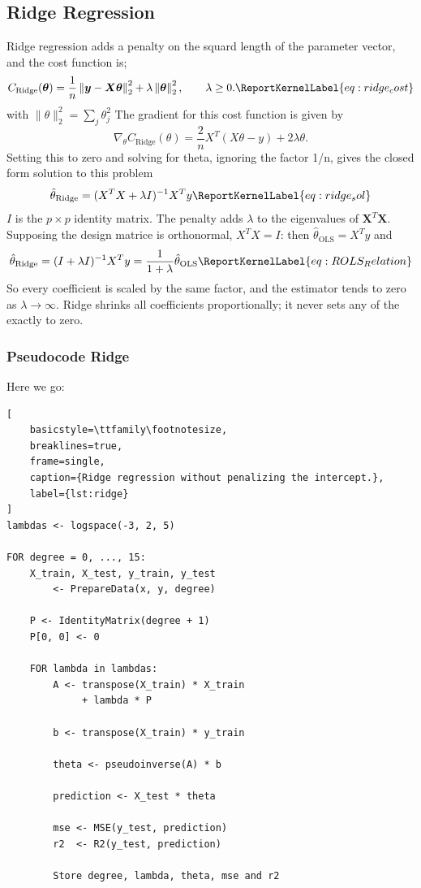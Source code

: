 \documentclass[aps,rmp,reprint,raggedbottom,amsmath,amssymb,longbibliography]{revtex4-1}
\let\label\ReportKernelLabel
\begin{document}
\subsection{Ridge Regression}
Ridge regression adds a penalty on the squard length of the parameter vector,
and the cost function is;
\begin{equation}
C_{\mathrm{Ridge}}(\bm{\theta})
= \frac{1}{n}
  \left\|\bm{y}-\bm{X}\bm{\theta}\right\|_2^2
  + \lambda\left\|\bm{\theta}\right\|_2^2,
\qquad \lambda \geq 0.
\label{eq:ridge_cost}
\end{equation}
with $\lVert\theta\rVert_2^2 = \sum_{j}\theta_j^2$ \newline 
The gradient for this cost function is given by
\begin{equation}
  \nabla_{\theta} C_{\mathrm{Ridge}}(\theta)
  = \frac{2}{n}X^T(X\theta-y)
    + 2\lambda \theta.
\end{equation}
Setting this to zero and solving for theta, ignoring the factor 1/n, 
gives the closed form solution to this problem
\begin{equation}
  \hat{\theta}_{\mathrm{Ridge}} =
  (X^{T}X + \lambda I)^{-1}X^{T}y
\label{eq:ridge_sol}
\end{equation}
$I$ is the $p\times p$ identity matrix. The penalty adds $\lambda$ to the eigenvalues
of $\bm{X}^{T}\bm{X}$. \cite[p.~87]{LectureNotes}
Supposing the design matrice is orthonormal, $X^{T}X=I$: then $\hat{\theta}_{\mathrm{OLS}}=X^{T}y$ and
\begin{equation}
  \hat{\theta}_{\mathrm{Ridge}}=
  (I + \lambda I)^{-1}X^{T}y =
  \frac{1}{1+\lambda}\hat{\theta}_{\mathrm{OLS}}
\label{eq:ROLS_Relation}
\end{equation}
So every coefficient is scaled by the same factor, and the estimator
tends to zero as $\lambda \to \infty$. Ridge shrinks all coefficients proportionally;
it never sets any of the exactly to zero.

\subsubsection{Pseudocode Ridge}
Here we go:
\begin{lstlisting}[
    basicstyle=\ttfamily\footnotesize,
    breaklines=true,
    frame=single,
    caption={Ridge regression without penalizing the intercept.},
    label={lst:ridge}
]
lambdas <- logspace(-3, 2, 5)

FOR degree = 0, ..., 15:
    X_train, X_test, y_train, y_test
        <- PrepareData(x, y, degree)

    P <- IdentityMatrix(degree + 1)
    P[0, 0] <- 0

    FOR lambda in lambdas:
        A <- transpose(X_train) * X_train
             + lambda * P

        b <- transpose(X_train) * y_train

        theta <- pseudoinverse(A) * b

        prediction <- X_test * theta

        mse <- MSE(y_test, prediction)
        r2  <- R2(y_test, prediction)

        Store degree, lambda, theta, mse and r2
\end{lstlisting}
\end{document}
